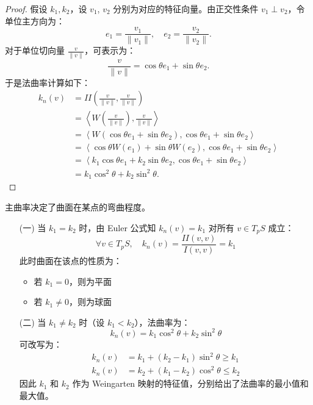 \documentclass[lang=cn,10pt,thmcnt=section]{elegantbook}
\begin{document}
    \begin{proof}
    假设 $k_1 , k_2$，设 $v_1$, $v_2$ 分别为对应的特征向量。由正交性条件 $v_1 \perp v_2$，令单位主方向为：
    \[
    e_1 = \frac{v_1}{\|v_1\|}, \quad e_2 = \frac{v_2}{\|v_2\|}.
    \]
    对于单位切向量 $\frac{v}{\|v\|}$，可表示为：
    \[
    \frac{v}{\|v\|} = \cos \theta e_1 + \sin \theta e_2.
    \]
    于是法曲率计算如下：
    \begin{align*}
    k_n(v) &= II\left( \frac{v}{\|v\|}, \frac{v}{\|v\|} \right) \\
    &= \left\langle W\left( \frac{v}{\|v\|} \right), \frac{v}{\|v\|} \right\rangle \\
    &= \left\langle W(\cos \theta e_1 + \sin \theta e_2), \cos \theta e_1 + \sin \theta e_2 \right\rangle \\
    &= \left\langle \cos \theta W(e_1) + \sin \theta W(e_2), \cos \theta e_1 + \sin \theta e_2 \right\rangle \\
    &= \left\langle k_1 \cos \theta e_1 + k_2 \sin \theta e_2, \cos \theta e_1 + \sin \theta e_2 \right\rangle \\
    &= k_1 \cos^2 \theta + k_2 \sin^2 \theta.
    \end{align*}
    \end{proof}
    \begin{corollary}[主曲率与曲面弯曲性质]
        主曲率决定了曲面在某点的弯曲程度。
        
        \begin{enumerate}
            \item[(一)] 当 $k_1 = k_2$ 时，由 Euler 公式知 $k_n(v) = k_1$ 对所有 $v \in T_pS$ 成立：
            \[
            \forall v \in T_pS, \quad k_n(v) = \frac{II(v, v)}{I(v,v)} = k_1
            \]
            此时曲面在该点的性质为：
            \begin{itemize}
                \item 若 $k_1 = 0$，则为平面
                \item 若 $k_1 \neq 0$，则为球面
            \end{itemize}
        
            \item[(二)] 当 $k_1 \neq k_2$ 时（设 $k_1 < k_2$），法曲率为：
            \[
            k_n(v) = k_1 \cos^2 \theta + k_2 \sin^2 \theta
            \]
            可改写为：
            \begin{align*}
            k_n(v) &= k_1 + (k_2 - k_1) \sin^2 \theta \geq k_1 \\
            k_n(v) &= k_2 + (k_1 - k_2) \cos^2 \theta \leq k_2
            \end{align*}
            因此 $k_1$ 和 $k_2$ 作为 Weingarten 映射的特征值，分别给出了法曲率的最小值和最大值。
        \end{enumerate}
        \end{corollary}
\end{document}
